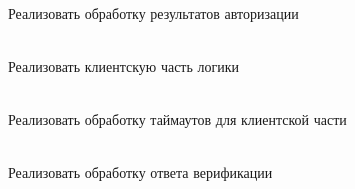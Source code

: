\begin{DoxyRefList}
\item[Member \doxylink{class_g_n_e_t_1_1_user_login2_ac662ac896d30d4f07db6a465fbb20ca3}{GNET\+::User\+Login2\+::Post\+Process} (Manager\+::\+Session\+::\+ID proxy\+\_\+sid, const Octets\+Stream \&os\+Arg, const Octets\+Stream \&os\+Res)]\hfill \\
\label{todo__todo000040}%
%
Реализовать обработку результатов авторизации  
\item[Member \doxylink{class_g_n_e_t_1_1_user_logout_a3367c6ce9755247ab27fd85957a50ebf}{GNET\+::User\+Logout\+::Client} (Rpc\+::\+Data \texorpdfstring{$\ast$}{*}argument, Rpc\+::\+Data \texorpdfstring{$\ast$}{*}result, Manager \texorpdfstring{$\ast$}{*}manager, Manager\+::\+Session\+::\+ID sid)]\hfill \\
\label{todo__todo000042}%
%
Реализовать клиентскую часть логики  
\item[Member \doxylink{class_g_n_e_t_1_1_user_logout_ae14b8440e018c0aabe72b1843f292753}{GNET\+::User\+Logout\+::On\+Timeout} ()]\hfill \\
\label{todo__todo000043}%
%
Реализовать обработку таймаутов для клиентской части  
\item[Member \doxylink{class_g_n_e_t_1_1_verify_master___re_a549010699fc4534896e58ff3aef11b9d}{GNET\+::Verify\+Master\+\_\+\+Re\+::Process} (Manager \texorpdfstring{$\ast$}{*}manager, Manager\+::\+Session\+::\+ID sid)]\hfill \\
\label{todo__todo000044}%
%
Реализовать обработку ответа верификации 
\end{DoxyRefList}